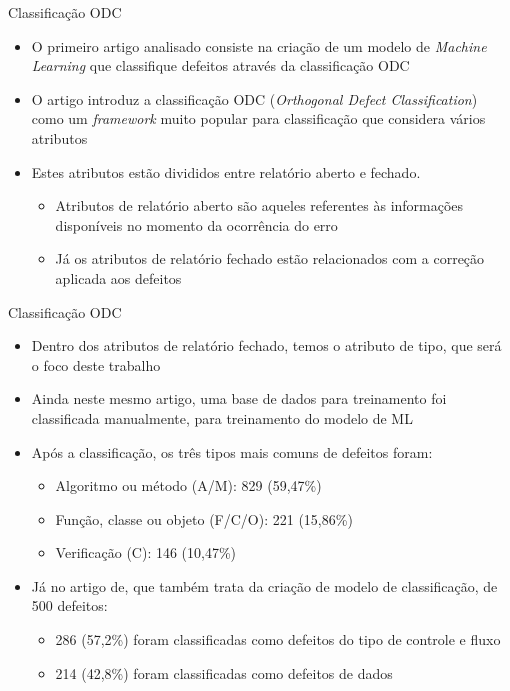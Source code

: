 \documentclass[brazilian]{beamer}
\begin{document}
\begin{frame}{Classificação ODC}
    \begin{itemize}
        \item O primeiro artigo analisado\cite{automatic_odc_using_ml} consiste na criação de um modelo de \emph{Machine Learning} que classifique defeitos através da classificação ODC
        \item O artigo introduz a classificação ODC (\textit{Orthogonal Defect Classification}) como um \textit{framework} muito popular para classificação que considera vários atributos
        \item Estes atributos estão divididos entre relatório aberto e fechado.
        \begin{itemize}
            \item Atributos de relatório aberto são aqueles referentes às informações disponíveis no momento da ocorrência do erro
            \item Já os atributos de relatório fechado estão relacionados com a correção aplicada aos defeitos
        \end{itemize}
    \end{itemize}
\end{frame}

\begin{frame}{Classificação ODC}
    \begin{itemize}
        \item Dentro dos atributos de relatório fechado, temos o atributo de tipo, que será o foco deste trabalho
        \item Ainda neste mesmo artigo, uma base de dados para treinamento foi classificada manualmente, para treinamento do modelo de ML
        \item Após a classificação, os três tipos mais comuns de defeitos foram:
        \begin{itemize}
            \item Algoritmo ou método (A/M): 829 (59,47\%)
            \item Função, classe ou objeto (F/C/O): 221 (15,86\%)
            \item Verificação (C): 146 (10,47\%)
        \end{itemize}
        \item Já no artigo de\cite{automatic_defect_categorization}, que também trata da criação de modelo de classificação, de 500 defeitos:
        \begin{itemize}
            \item 286 (57,2\%) foram classificadas como defeitos do tipo de controle e fluxo
            \item 214 (42,8\%) foram classificadas como defeitos de dados 
        \end{itemize}
    \end{itemize}
\end{frame}
\end{document}
